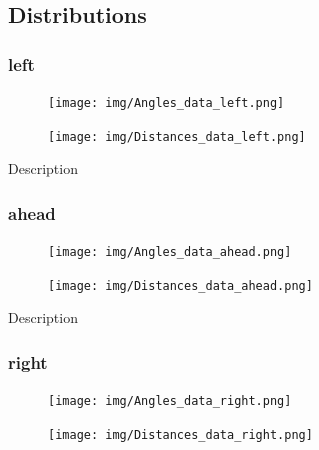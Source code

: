 \documentclass{scrartcl}
\begin{document}
\subsection{Distributions}

\subsubsection{left}
\begin{figure}[H]
\centering
\begin{minipage}{.5\textwidth}
  \centering
  \texttt{[image: img/Angles\_data\_left.png]}
\end{minipage}%
\begin{minipage}{.5\textwidth}
  \centering
  \texttt{[image: img/Distances\_data\_left.png]}
\end{minipage}
\end{figure}

Description


\subsubsection{ahead}
\begin{figure}[H]
\centering
\begin{minipage}{.5\textwidth}
  \centering
  \texttt{[image: img/Angles\_data\_ahead.png]}
\end{minipage}%
\begin{minipage}{.5\textwidth}
  \centering
  \texttt{[image: img/Distances\_data\_ahead.png]}
\end{minipage}
\end{figure}

Description

\subsubsection{right}

\begin{figure}[H]
\centering
\begin{minipage}{.5\textwidth}
  \centering
  \texttt{[image: img/Angles\_data\_right.png]}
\end{minipage}%
\begin{minipage}{.5\textwidth}
  \centering
  \texttt{[image: img/Distances\_data\_right.png]}
\end{minipage}
\end{figure}
\end{document}
